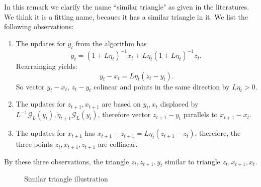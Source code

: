 \documentclass[12pt]{article}
\begin{document}
        \begin{remark}
            In this remark we clarify the name ``similar triangle" as given in the literatures. 
            We think it is a fitting name, becaues it has a similar triangle in it. 
            We list the following observations:
            \begin{enumerate}
                \item 
                The updates for $y_{t}$ from the algorithm has 
                $$
                    y_t = (1 + L\eta_t)^{-1} x_t + L\eta_t(1 + L\eta_t)^{-1} z_t, 
                $$
                Rearrainging yields: 
                $$
                    y_t - x_t = L\eta_t (z_t - y_t). 
                $$
                So vector $y_t - x_t$, $z_t - y_t$ colinear and points in the same direction by $L\eta_t > 0$. 
                \item 
                The updates for $z_{t + 1}, x_{t + 1}$ are based on $y_t, x_t$ displaced by $L^{-1} \mathcal G_L(y_t), \tilde\eta_{t +1} \mathcal G_L(y_t)$, therefore vector $z_{t + 1} - y_t$ parallels to $x_{t + 1} - x_t$. 
                \item 
                The updates for $x_{t + 1}$ has $x_{t + 1} - z_{t + 1} = L\eta_t \left(z_{t + 1} - z_t\right)$, therefore, the three points $z_t, x_{t + 1}, z_{t + 1}$ are collinear. 
            \end{enumerate}
            By these three observations, the triangle $z_{t}, z_{t + 1}, y_t$ similar to triangle $z_t, x_{t + 1}, x_t$. 
            \begin{figure}[h]
                \centering
                \caption{Similar triangle illustration}
                \label{steady_state}
            \end{figure}


\end{remark}
\end{document}
